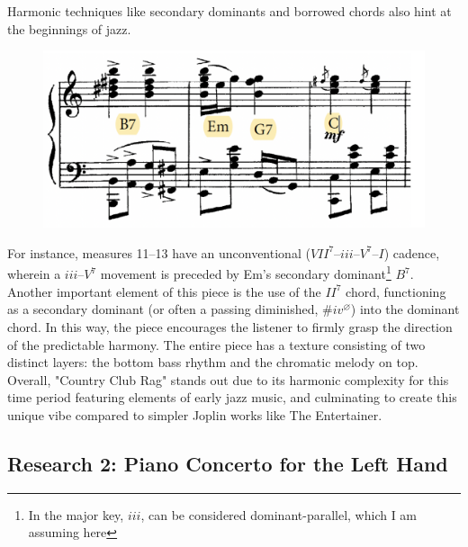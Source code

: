 \documentclass[12pt]{article}
\begin{document}
Harmonic techniques like secondary dominants and borrowed chords also hint at the beginnings of jazz. 
\begin{figure}[H]
\begin{center}
\includegraphics[width=0.4\linewidth]{joplin3}
\end{center}
\end{figure}
For instance, measures 11–13 have an unconventional ($VII^7–iii–V^7–I$) cadence, wherein a $iii–V^7$ movement is preceded by Em's secondary dominant\footnote{In the major key, $iii$, can be considered dominant-parallel, which I am assuming here} $B^7$. Another important element of this piece is the use of the $II^7$ chord, functioning as a secondary dominant (or often a passing diminished, $\# iv^{\varnothing}$) into the dominant chord. In this way, the piece encourages the listener to firmly grasp the direction of the predictable harmony. The entire piece has a texture consisting of two distinct layers: the bottom bass rhythm and the chromatic melody on top. Overall, "Country Club Rag" stands out due to its harmonic complexity for this time period featuring elements of early jazz music, and culminating to create this unique vibe compared to simpler Joplin works like The Entertainer.


\subsection{Research 2: Piano Concerto for the Left Hand}
\end{document}
